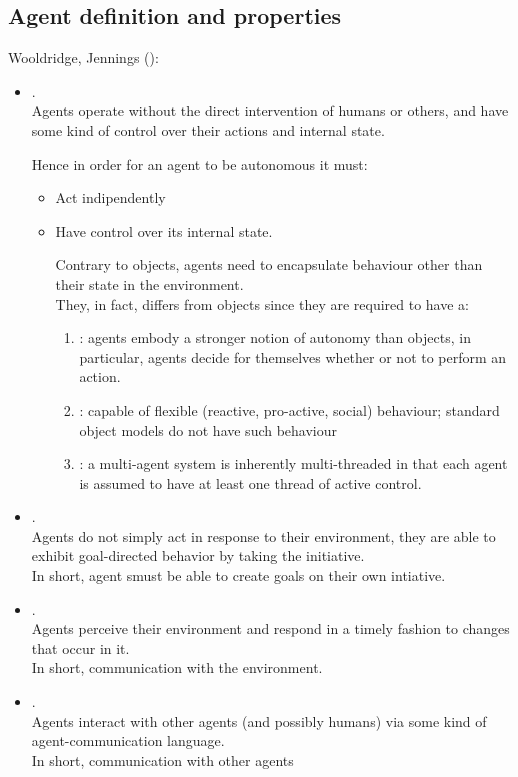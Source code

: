 \subsection{Agent definition and properties}
Wooldridge, Jennings ():\\
\begin{itemize}
\item {}.\\
Agents operate without the direct intervention of humans or others, and have some kind of control over their actions and internal state.

Hence in order for an agent to be autonomous it must:
\begin{itemize}
\item Act indipendently
\item Have control over its internal state.

Contrary to objects, agents need to encapsulate behaviour other than their state in the environment.\\
They, in fact, differs from objects since they are required to have a:
\begin{enumerate}
\item {}: agents embody a stronger notion of autonomy than objects, in particular, agents decide for themselves whether or not to perform an action.
\item {}: capable of flexible (reactive, pro-active, social) behaviour; standard object models do not have such behaviour
\item {}: a multi-agent system is inherently multi-threaded in that each agent is assumed to have at least one thread of active control.
\end{enumerate}
\end{itemize}
\item {}.\\
Agents do not simply act in response to their environment, they are able to exhibit goal-directed behavior by taking the initiative.\\
In short, agent smust be able to create goals on their own intiative.
\item {}.\\
Agents perceive their environment and respond in a timely fashion to changes that occur in it.\\
In short, communication with the environment.
\item {}.\\
Agents interact with other agents (and possibly humans) via some kind of agent-communication language.\\
In short, communication with other agents
\end{itemize}


